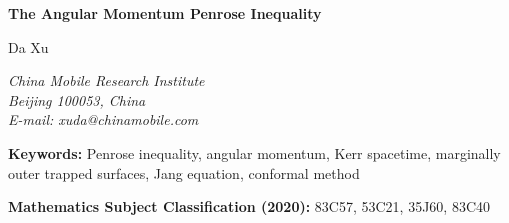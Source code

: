 \documentclass[12pt]{article}
\theoremstyle{plain}
\theoremstyle{definition}
\theoremstyle{remark}
\newcommand{\ADM}{\mathrm{ADM}}
\begin{document}

\begin{center}
{\LARGE\bfseries The Angular Momentum Penrose Inequality}

\vspace{1cm}

{\large Da Xu}

\vspace{0.3cm}

{\itshape China Mobile Research Institute\\
Beijing 100053, China\\
E-mail: xuda@chinamobile.com}

\vspace{0.3cm}

\end{center}

\vspace{1cm}
\begin{abstract}
We establish the Penrose inequality with angular momentum for asymptotically flat, axisymmetric vacuum initial data containing a strictly stable marginally outer trapped surface. Specifically, if $(M^3, g, K)$ satisfies the dominant energy condition and $\Sigma$ denotes the outermost MOTS with area $A$ and Komar angular momentum $J$, then
\[
M_{\ADM} \geq \sqrt{\frac{A}{16\pi} + \frac{4\pi J^2}{A}},
\]
with equality characterizing slices of Kerr. The argument combines the Jang equation approach of Bray--Khuri and Han--Khuri with the $p$-harmonic level set method of Agostiniani--Mazzieri--Oronzio. A central role is played by a modified Hawking mass that incorporates angular momentum and remains monotone along the flow. The conservation of $J$ under this flow relies on the vacuum hypothesis through a cohomological argument. We also characterize the equality case using the Mars--Simon tensor.
\end{abstract}

\vspace{0.5cm}
\noindent\textbf{Keywords:} Penrose inequality, angular momentum, Kerr spacetime, marginally outer trapped surfaces, Jang equation, conformal method

\vspace{0.3cm}
\noindent\textbf{Mathematics Subject Classification (2020):} 83C57, 53C21, 35J60, 83C40

\tableofcontents


\end{document}
